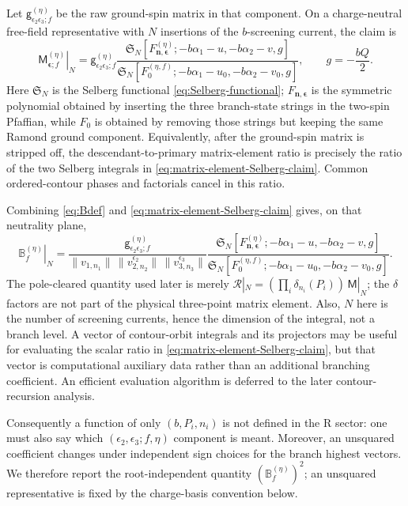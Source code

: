 \documentclass[11pt]{article}
\newcommand{\cR}{\mathcal R}
\newcommand{\eps}{\epsilon}
\begin{document}
Let $\mathsf g_{\eps_2\eps_3;f}^{(\eta)}$ be the raw ground-spin matrix
in that component.  On a charge-neutral free-field representative with
$N$ insertions of the $b$-screening current, the claim is
\begin{equation}
 \left.\mathsf M_{\boldsymbol\eps;f}^{(\eta)}\right|_N
 =\mathsf g_{\eps_2\eps_3;f}^{(\eta)}
 \frac{\mathfrak S_N[
 F^{(\eta)}_{\boldsymbol n,\boldsymbol\eps};
 -b\alpha_1-u,-b\alpha_2-v,g]}
 {\mathfrak S_N[
 F_0^{(\eta,f)};
 -b\alpha_1-u_0,-b\alpha_2-v_0,g]},
 \qquad g=-\frac{bQ}{2}.
 \label{eq:matrix-element-Selberg-claim}
\end{equation}
Here $\mathfrak S_N$ is the Selberg functional
\eqref{eq:Selberg-functional}; $F_{\boldsymbol n,\boldsymbol\eps}$ is the
symmetric polynomial obtained by inserting the three branch-state strings
in the two-spin Pfaffian, while $F_0$ is obtained by removing those strings
but keeping the same Ramond ground component.  Equivalently, after the
ground-spin matrix is stripped off, the descendant-to-primary matrix-element
ratio is precisely the ratio of the two Selberg integrals in
\eqref{eq:matrix-element-Selberg-claim}.  Common ordered-contour phases and
factorials cancel in this ratio.

Combining \eqref{eq:Bdef} and
\eqref{eq:matrix-element-Selberg-claim} gives, on that neutrality plane,
\begin{equation}
 \left.\mathbb B_f^{(\eta)}\right|_N
 =\frac{\mathsf g_{\eps_2\eps_3;f}^{(\eta)}}
 {\|v_{1,n_1}\|\,\|v_{2,n_2}^{\eps_2}\|\,
  \|v_{3,n_3}^{\eps_3}\|}
 \frac{\mathfrak S_N[F_{\boldsymbol n,\boldsymbol\eps}^{(\eta)};
 -b\alpha_1-u,-b\alpha_2-v,g]}
 {\mathfrak S_N[F_0^{(\eta,f)};
 -b\alpha_1-u_0,-b\alpha_2-v_0,g]}.
 \label{eq:branching-Selberg-claim}
\end{equation}
The pole-cleared quantity used later is merely
$\cR|_N=(\prod_i\delta_{n_i}(P_i))\,\mathsf M|_N$; the $\delta$ factors
are not part of the physical three-point matrix element.  Also, $N$ here
is the number of screening currents, hence the dimension of the integral,
not a branch level.  A vector of contour-orbit integrals and its projectors
may be useful for evaluating the scalar ratio in
\eqref{eq:matrix-element-Selberg-claim}, but that vector is computational
auxiliary data rather than an additional branching coefficient.  An
efficient evaluation algorithm is deferred to the later contour-recursion
analysis.

Consequently a function of only $(b,P_i,n_i)$ is not defined in the R
sector: one must also say which $(\eps_2,\eps_3;f,\eta)$ component is meant.
Moreover, an unsquared coefficient changes under independent sign choices
for the branch highest vectors.  We therefore report the root-independent
quantity $(\mathbb B_f^{(\eta)})^2$; an unsquared representative is
fixed by the charge-basis convention below.
\end{document}
